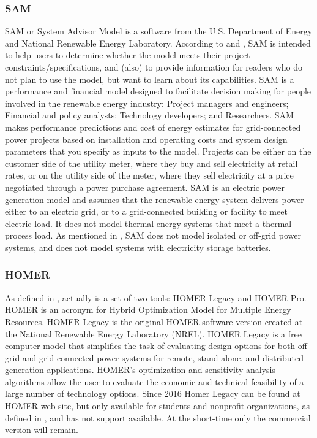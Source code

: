 \subsubsection{SAM}
SAM or System Advisor Model is a software from the U.S. Department of Energy and National Renewable Energy Laboratory. According to \cite{NRELBlair} and \cite{Cameron2008}, SAM is intended to help users to determine whether the model meets their project constraints/specifications, and (also) to provide information for readers who do not plan to use the model, but want to learn about its capabilities. SAM is a performance and financial model designed to facilitate decision making for people involved in the renewable energy industry: Project managers and engineers; Financial and policy analysts; Technology developers; and Researchers. SAM makes performance predictions and cost of energy estimates for grid-connected power projects based on installation and operating costs and system design parameters that you specify as inputs to the model. Projects can be either on the customer side of the utility meter, where they buy and sell electricity at retail rates, or on the utility side of the meter, where they sell electricity at a price negotiated through a power purchase agreement. SAM is an electric power generation model and assumes that the renewable energy system delivers power either to an electric grid, or to a grid-connected building or facility to meet electric load. It does not model thermal energy systems that meet a thermal process load. As mentioned in \cite{NRELBlair}, SAM does not model isolated or off-grid power systems, and does not model systems with electricity storage batteries.

\subsubsection{HOMER}
As defined in \cite{HOMER}, actually is a set of two tools: HOMER Legacy and HOMER Pro. HOMER is an acronym for Hybrid Optimization Model for Multiple Energy Resources. HOMER Legacy is the original HOMER software version created at the National Renewable Energy Laboratory (NREL). HOMER Legacy is a free computer model that simplifies the task of evaluating design options for both off-grid and grid-connected power systems for remote, stand-alone, and distributed generation applications. HOMER's optimization and sensitivity analysis algorithms allow the user to evaluate the economic and technical feasibility of a large number of technology options. Since 2016 Homer Legacy can be found at HOMER web site, but only available for students and nonprofit organizations, as defined in \cite{HOMER}, and has not support available. At the short-time only the commercial version will remain.
 
